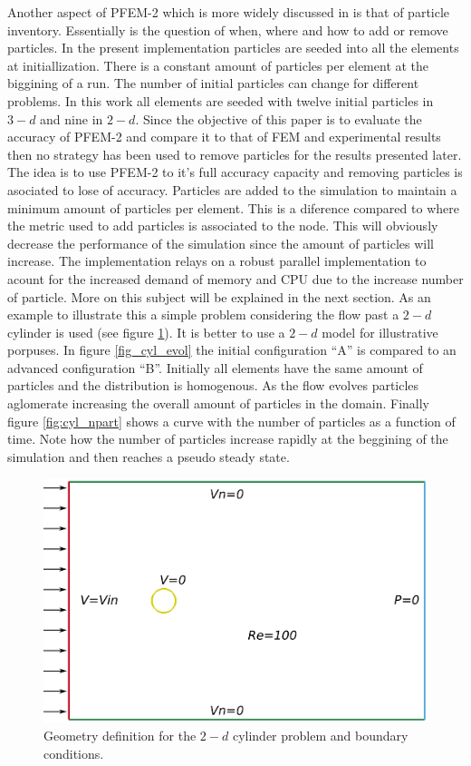 Another aspect of PFEM-2 which is more widely discussed in \cite{gimenez-difusion} is that of particle inventory. Essentially is the question of when, where and how to add or remove particles. In the present implementation particles are seeded into all the elements at initiallization. There is a constant amount of particles per element at the biggining of a run. The number of initial particles can change for different problems. In this work all elements are seeded with twelve initial particles in $3-d$ and nine in $2-d$. Since the objective of this paper is to evaluate the accuracy of PFEM-2 and compare it to that of FEM and experimental results then no strategy has been used to remove particles for the results presented later. The idea is to use PFEM-2 to it's full accuracy capacity and removing particles is asociated to lose of accuracy. Particles are added to the simulation to maintain a minimum amount of particles per element. This is a diference compared to \cite{gimenez-difusion} where the metric used to add particles is associated to the node. This will obviously decrease the performance of the simulation since the amount of particles will increase. The implementation relays on a robust parallel implementation to acount for the increased demand of memory and CPU due to the increase number of particle. More on this subject will be explained in the next section. As an example to illustrate this a simple problem considering the flow past a $2-d$ cylinder is used (see figure \ref{fig:cyl_def}). It is better to use a $2-d$ model for illustrative porpuses. In figure \ref{fig_cyl_evol} the initial configuration ``A'' is compared to an advanced configuration ``B''. Initially all elements have the same amount of particles and the distribution is homogenous. As the flow evolves particles aglomerate increasing the overall amount of particles in the domain. Finally figure \ref{fig:cyl_npart} shows a curve with the number of particles as a function of time. Note how the number of particles increase rapidly at the beggining of the simulation and then reaches a pseudo steady state.


\begin{figure}[htp] 
\centering 
\includegraphics[scale=.5]{./imgs/cyl_def.png}
\caption{Geometry definition for the $2-d$ cylinder problem and boundary conditions.}
\label{fig:cyl_def}
\end{figure}

